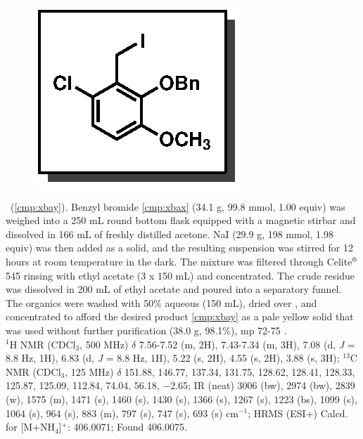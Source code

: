 \vspace{10pt}
\begin{figure}
  \vspace{-25pt}
  \begin{center}
    \includegraphics[scale=0.8]{chp_singlecarbon/images/xbay}
  \end{center}
  \vspace{-30pt}
\end{figure}\noindent \textbf{\CMPxbay}\ (\ref{cmp:xbay}). Benzyl bromide \ref{cmp:xbax} (34.1
g, 99.8 mmol, 1.00 equiv) was weighed into a 250 mL round bottom flask equipped with a magnetic
stirbar and dissolved in 166 mL of freshly distilled acetone. NaI (29.9 g, 198 mmol, 1.98 equiv) was then added as a solid, and the resulting suspension was stirred for 12 hours at room temperature in
the dark. The mixture was filtered through Celite$\textsuperscript{\textregistered}$ 545 rinsing with ethyl acetate (3 x 150 mL)
and concentrated. The crude residue was dissolved in 200 mL of ethyl acetate and poured into a
separatory funnel. The organics were washed with 50\% aqueous  (150 mL), dried over
, and concentrated to afford the desired product \ref{cmp:xbay} as a pale yellow solid
that was used without further purification (38.0 g, 98.1\%), mp 72-75 \degc. \\
$^1$H NMR (CDCl$_3$, 500 MHz) $\delta$ 7.56-7.52 (m, 2H), 7.43-7.34 (m, 3H), 7.08 (d, \textit{J} = 8.8 Hz, 1H),
6.83 (d, \textit{J} = 8.8 Hz, 1H), 5.22 (s, 2H), 4.55 (s, 2H), 3.88 (s, 3H); $^{13}$C NMR (CDCl$_3$, 125
MHz) $\delta$ 151.88, 146.77, 137.34, 131.75, 128.62, 128.41, 128.33, 125.87, 125.09, 112.84, 74.04,
56.18, $-$2.65; IR (neat) 3006 (bw), 2974 (bw), 2839 (w), 1575 (m), 1471 (s), 1460 (s), 1430 (s),
1366 (s), 1267 (s), 1223 (bs), 1099 (s), 1064 (s), 964 (s), 883 (m), 797 (s), 747 (s), 693 (s) cm$^{-1}$; HRMS (ESI+) Calcd. for  [M+NH$_4$]$^+$: 406.0071; Found 406.0075.

